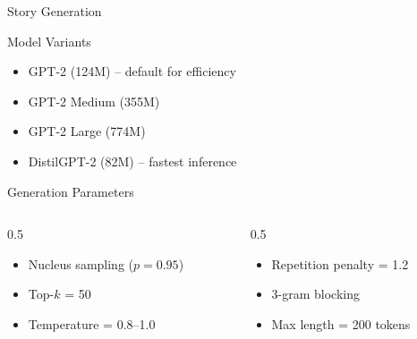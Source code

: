 \documentclass[aspectratio=169]{beamer}
\begin{document}
\begin{frame}{Story Generation}
    \begin{block}{Model Variants}
        \begin{itemize}
            \item GPT-2 (124M) -- default for efficiency
            \item GPT-2 Medium (355M)
            \item GPT-2 Large (774M)
            \item DistilGPT-2 (82M) -- fastest inference
        \end{itemize}
    \end{block}
    
    \vspace{0.3cm}
    
    \begin{block}{Generation Parameters}
        \begin{columns}
            \begin{column}{0.5\textwidth}
                \begin{itemize}
                    \item Nucleus sampling ($p=0.95$)
                    \item Top-$k$ = 50
                    \item Temperature = 0.8--1.0
                \end{itemize}
            \end{column}
            \begin{column}{0.5\textwidth}
                \begin{itemize}
                    \item Repetition penalty = 1.2
                    \item 3-gram blocking
                    \item Max length = 200 tokens
                \end{itemize}
            \end{column}
        \end{columns}
    \end{block}
\end{frame}
\end{document}
